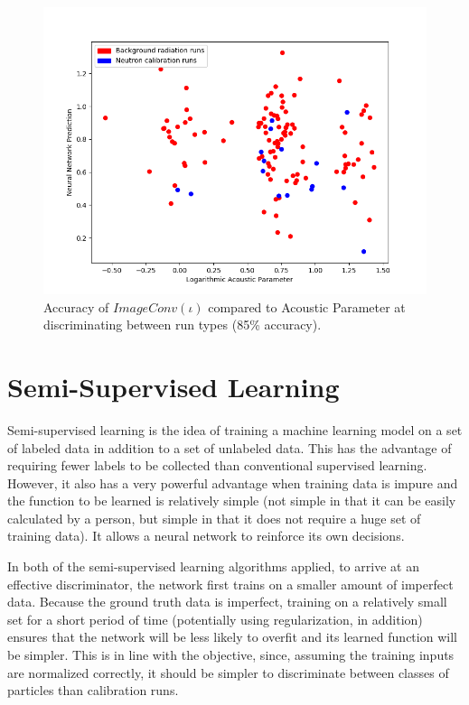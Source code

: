 \documentclass[10pt]{article}
\begin{document}
\begin{figure}[h]
    \centering
    \includegraphics[width=\textwidth]{image_window}
    \caption{\label{image_window} Accuracy of $ImageConv(\iota)$ compared to Acoustic Parameter at discriminating between run types (85\% accuracy).}
\end{figure}

\section{Semi-Supervised Learning}

Semi-supervised learning is the idea of training a machine learning model on a set of labeled data in addition to a set of unlabeled data. This has the advantage of requiring fewer labels to be collected than conventional supervised learning. However, it also has a very powerful advantage when training data is impure and the function to be learned is relatively simple (not simple in that it can be easily calculated by a person, but simple in that it does not require a huge set of training data). It allows a neural network to reinforce its own decisions.

In both of the semi-supervised learning algorithms applied, to arrive at an effective discriminator, the network first trains on a smaller amount of imperfect data. Because the ground truth data is imperfect, training on a relatively small set for a short period of time (potentially using regularization, in addition) ensures that the network will be less likely to overfit and its learned function will be simpler. This is in line with the objective, since, assuming the training inputs are normalized correctly, it should be simpler to discriminate between classes of particles than calibration runs.
\end{document}
